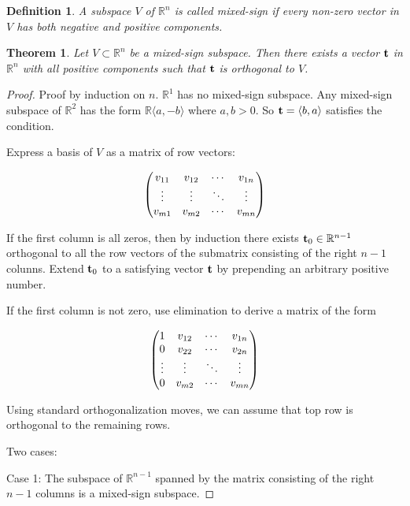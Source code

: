 \documentclass[11pt]{article}
\theoremstyle{plain} \newtheorem{thm}{Theorem}%
\theoremstyle{plain} \newtheorem{define}{Definition}%
\theoremstyle{plain} \newtheorem{example}{Example}%
\theoremstyle{plain} \newtheorem{remark}{Remark}%
\newcommand{\reals}{\mathbb{R}}
\newcommand{\realn}{\mathbb{R}^n}
\newcommand{\mixed}{mixed-sign}
\begin{document}
\begin{define}
    A subspace $V$ of $\realn$ is called \mixed{} if every non-zero
    vector in $V$ has both negative and positive components.
\end{define}

\begin{thm}
    Let $V \subset \realn$ be a \mixed{} subspace.  Then there exists a
    vector $\bf t$ in $\realn$ with all positive components such that
    $\bf t$ is orthogonal to $V$.
\end{thm}

\begin{proof}
    Proof by induction on $n$.  $\reals^1$ has no \mixed{} subspace.
    Any \mixed{} subspace of $\reals^2$ has the form $\reals
    \langle a, -b\rangle$ where $a,b > 0$.  So ${\bf t} = \langle b,
    a\rangle$ satisfies the condition.

    Express a basis of $V$ as a matrix of row vectors:

    \begin{equation*}
    \begin{pmatrix}
    v_{11}&v_{12}&\cdots&v_{1n}\cr
    \vdots&\vdots&\ddots&\vdots\cr
    v_{m1}&v_{m2}&\cdots&v_{mn}\cr
    \end{pmatrix}
    \end{equation*}

    If the first column is all zeros, then by induction there exists
    ${\bf t}_0 \in \reals{}^{n-1}$ orthogonal to all the row vectors of
    the submatrix consisting of the right $n-1$ colunns.  Extend
    ${\bf t}_0$ to a satisfying vector $\bf t$ by prepending an arbitrary
    positive number.

    If the first column is not zero, use elimination to derive a matrix
    of the form

    \begin{equation*}
    \begin{pmatrix}
    1&v_{12}&\cdots&v_{1n}\cr
    0&v_{22}&\cdots&v_{2n}\cr
    \vdots&\vdots&\ddots&\vdots\cr
    0&v_{m2}&\cdots&v_{mn}\cr
    \end{pmatrix}
    \end{equation*}

    Using standard orthogonalization moves, we can assume that top row
    is orthogonal to the remaining rows.

    Two cases:

    \noindent Case 1:  The subspace of $\reals^{n-1}$ spanned by the
    matrix consisting of the right $n-1$ columns is a \mixed{} subspace.


\end{proof}
\end{document}
